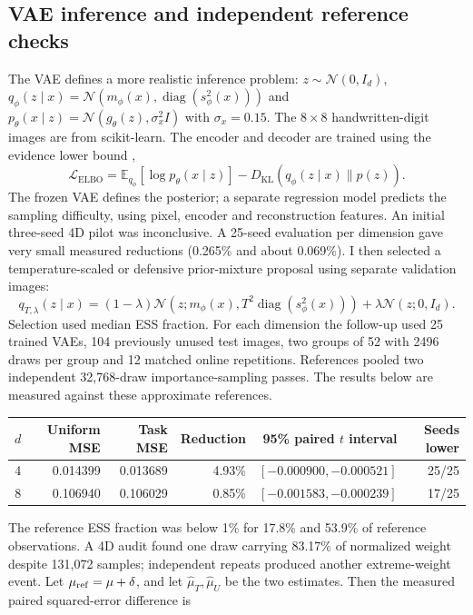 \documentclass[11pt,letterpaper]{article}
\newcommand{\E}{\mathbb E}
\newcommand{\N}{\mathcal N}
\newcommand{\KL}{D_{\mathrm{KL}}}
\begin{document}
\subsection{VAE inference and independent reference checks}
The VAE defines a more realistic inference problem: $z\sim\N(0,I_d)$, $q_\phi(z\mid x)=\N(m_\phi(x),\operatorname{diag}(s_\phi^2(x)))$ and $p_\theta(x\mid z)=\N(g_\theta(z),\sigma_x^2 I)$ with $\sigma_x=0.15$. The $8\times8$ handwritten-digit images are from scikit-learn. The encoder and decoder are trained using the evidence lower bound \cite{kingma2014},
\begin{equation}
 \mathcal L_{\mathrm{ELBO}}=\E_{q_\phi}[\log p_\theta(x\mid z)]-\KL(q_\phi(z\mid x)\|p(z)).
\end{equation}
The frozen VAE defines the posterior; a separate regression model predicts the sampling difficulty, using pixel, encoder and reconstruction features. An initial three-seed 4D pilot was inconclusive. A 25-seed evaluation per dimension gave very small measured reductions (0.265\% and about 0.069\%). I then selected a temperature-scaled or defensive prior-mixture proposal using separate validation images:
\begin{equation}
 q_{T,\lambda}(z\mid x)=(1-\lambda)\N(z;m_\phi(x),T^2\operatorname{diag}(s_\phi^2(x)))+\lambda\N(z;0,I_d).
\end{equation}
Selection used median ESS fraction. For each dimension the follow-up used 25 trained VAEs, 104 previously unused test images, two groups of 52 with 2496 draws per group and 12 matched online repetitions. References pooled two independent 32,768-draw importance-sampling passes. The results below are measured against these approximate references.
\begin{center}\small
\begin{tabular}{@{}r rrr r r@{}}
\toprule
$d$ & Uniform MSE & Task MSE & Reduction & 95\% paired $t$ interval & Seeds lower\\
\midrule
4&0.014399&0.013689&4.93\%&$[-0.000900,-0.000521]$&25/25\\
8&0.106940&0.106029&0.85\%&$[-0.001583,-0.000239]$&17/25\\
\bottomrule
\end{tabular}
\end{center}
The reference ESS fraction was below 1\% for 17.8\% and 53.9\% of reference observations. A 4D audit found one draw carrying 83.17\% of normalized weight despite 131,072 samples; independent repeats produced another extreme-weight event. Let $\mu_{\rm ref}=\mu+\delta$, and let $\widehat\mu_T,\widehat\mu_U$ be the two estimates. Then the measured paired squared-error difference is
\end{document}
